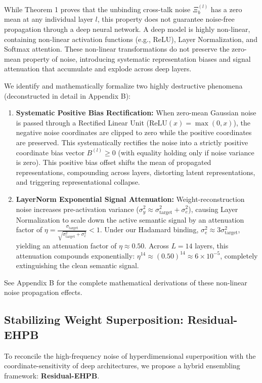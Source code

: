While Theorem 1 proves that the unbinding cross-talk noise $\Xi_b^{(l)}$ has a zero mean at any individual layer $l$, this property does not guarantee noise-free propagation through a deep neural network. A deep model is highly non-linear, containing non-linear activation functions (e.g., ReLU), Layer Normalization, and Softmax attention. These non-linear transformations do not preserve the zero-mean property of noise, introducing systematic representation biases and signal attenuation that accumulate and explode across deep layers.

We identify and mathematically formalize two highly destructive phenomena (deconstructed in detail in Appendix B):
\begin{enumerate}
\item \textbf{Systematic Positive Bias Rectification:} When zero-mean Gaussian noise is passed through a Rectified Linear Unit ($\text{ReLU}(x) = \max(0, x)$), the negative noise coordinates are clipped to zero while the positive coordinates are preserved. This systematically rectifies the noise into a strictly positive coordinate bias vector $B^{(l)} \geq 0$ (with equality holding only if noise variance is zero). This positive bias offset shifts the mean of propagated representations, compounding across layers, distorting latent representations, and triggering representational collapse.
\item \textbf{LayerNorm Exponential Signal Attenuation:} Weight-reconstruction noise increases pre-activation variance ($\sigma_y^2 \approx \sigma_{\text{target}}^2 + \sigma_e^2$), causing Layer Normalization to scale down the active semantic signal by an attenuation factor of $\eta = \frac{\sigma_{\text{target}}}{\sqrt{\sigma_{\text{target}}^2 + \sigma_e^2}} < 1$. Under our Hadamard binding, $\sigma_e^2 \approx 3 \sigma_{\text{target}}^2$, yielding an attenuation factor of $\eta \approx 0.50$. Across $L=14$ layers, this attenuation compounds exponentially: $\eta^{14} \approx (0.50)^{14} \approx 6 \times 10^{-5}$, completely extinguishing the clean semantic signal.
\end{enumerate}
See Appendix B for the complete mathematical derivations of these non-linear noise propagation effects.

\subsection{Stabilizing Weight Superposition: Residual-EHPB}
\label{subsec:residual_ehpb}

To reconcile the high-frequency noise of hyperdimensional superposition with the coordinate-sensitivity of deep architectures, we propose a hybrid ensembling framework: \textbf{Residual-EHPB}. 

